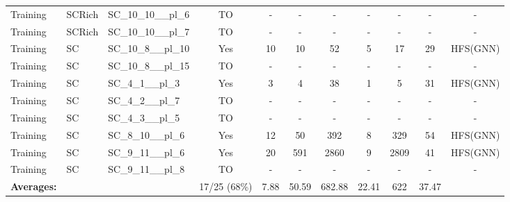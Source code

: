 \documentclass{article}
\begin{document}
\begin{tabular}{lllcccccccc}
Training & SCRich & SC\_10\_10\_\_pl\_6 & TO & - & - & - & - & - & - & - \\
Training & SCRich & SC\_10\_10\_\_pl\_7 & TO & - & - & - & - & - & - & - \\
Training & SC & SC\_10\_8\_\_pl\_10 & Yes & 10 & 10 & 52 & 5 & 17 & 29 & HFS(GNN) \\
Training & SC & SC\_10\_8\_\_pl\_15 & TO & - & - & - & - & - & - & - \\
Training & SC & SC\_4\_1\_\_pl\_3 & Yes & 3 & 4 & 38 & 1 & 5 & 31 & HFS(GNN) \\
Training & SC & SC\_4\_2\_\_pl\_7 & TO & - & - & - & - & - & - & - \\
Training & SC & SC\_4\_3\_\_pl\_5 & TO & - & - & - & - & - & - & - \\
Training & SC & SC\_8\_10\_\_pl\_6 & Yes & 12 & 50 & 392 & 8 & 329 & 54 & HFS(GNN) \\
Training & SC & SC\_9\_11\_\_pl\_6 & Yes & 20 & 591 & 2860 & 9 & 2809 & 41 & HFS(GNN) \\
Training & SC & SC\_9\_11\_\_pl\_8 & TO & - & - & - & - & - & - & - \\
\textbf{Averages:} & & & 17/25 (68\%) & 7.88 & 50.59 & 682.88 & 22.41 & 622 & 37.47 & \\
\bottomrule
\end{tabular}
\newpage
\end{document}
